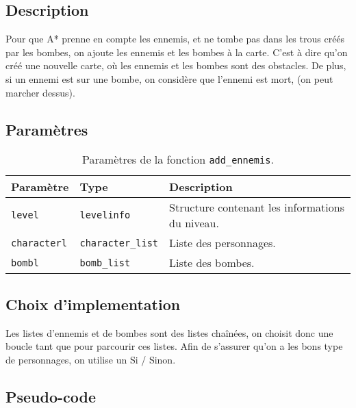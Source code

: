 \subsection{Description}

Pour que A* prenne en compte les ennemis, et ne tombe pas dans les trous créés par les bombes, on ajoute les ennemis et les bombes à la carte.
C'est à dire qu'on créé une nouvelle carte, où les ennemis et les bombes sont des obstacles.
De plus, si un ennemi est sur une bombe, on considère que l'ennemi est mort, (on peut marcher dessus).

\subsection{Paramètres}

\begin{table}[!htpb]
    \begin{tabularx}{\textwidth}{lXX}
        \toprule
        \textbf{Paramètre} & \textbf{Type} & \textbf{Description} \\
        \midrule
        \texttt{level} & \texttt{levelinfo} & Structure contenant les informations du niveau. \\
        \texttt{characterl} & \texttt{character\_list} & Liste des personnages. \\
        \texttt{bombl} & \texttt{bomb\_list} & Liste des bombes. \\
        \bottomrule
    \end{tabularx}
    \caption{Paramètres de la fonction \texttt{add\_ennemis}.}
    \label{tab:parameters-add_ennemis}
\end{table}

\subsection{Choix d'implementation}

Les listes d'ennemis et de bombes sont des listes chaînées, on choisit donc une boucle tant que pour parcourir ces listes.
Afin de s'assurer qu'on a les bons type de personnages, on utilise un Si / Sinon.

\subsection{Pseudo-code}

